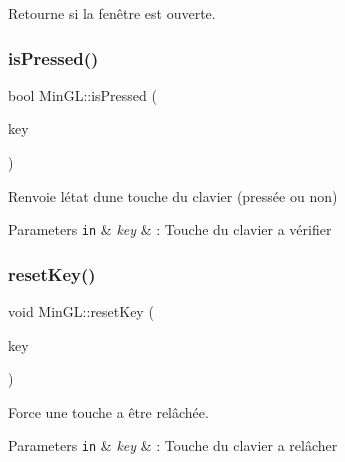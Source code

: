Retourne si la fenêtre est ouverte. 

\mbox{\label{class_min_g_l_a8f0833403a4fb3df8010c132e81b207f}} 
\subsubsection{\texorpdfstring{is\+Pressed()}{isPressed()}}
{\footnotesize\ttfamily bool Min\+G\+L\+::is\+Pressed (\begin{DoxyParamCaption}\item[{const \hyperlink{class_min_g_l_a6e612d21ed9723c37ad91093f7b48c96}{Key\+Type\+\_\+t} \&}]{key }\end{DoxyParamCaption})}



Renvoie l\textquotesingle{}état d\textquotesingle{}une touche du clavier (pressée ou non) 


\begin{DoxyParams}[1]{Parameters}
\mbox{\tt in}  & {\em key} & \+: Touche du clavier a vérifier \\
\hline
\end{DoxyParams}
\mbox{\label{class_min_g_l_a99750fd4c8f97cfe693b1acb903424cf}} 
\subsubsection{\texorpdfstring{reset\+Key()}{resetKey()}}
{\footnotesize\ttfamily void Min\+G\+L\+::reset\+Key (\begin{DoxyParamCaption}\item[{const \hyperlink{class_min_g_l_a6e612d21ed9723c37ad91093f7b48c96}{Key\+Type\+\_\+t} \&}]{key }\end{DoxyParamCaption})}



Force une touche a être relâchée. 


\begin{DoxyParams}[1]{Parameters}
\mbox{\tt in}  & {\em key} & \+: Touche du clavier a relâcher \\
\hline
\end{DoxyParams}
\mbox{\label{class_min_g_l_a4399b7615cea89f850cd5c66e428c367}} 
